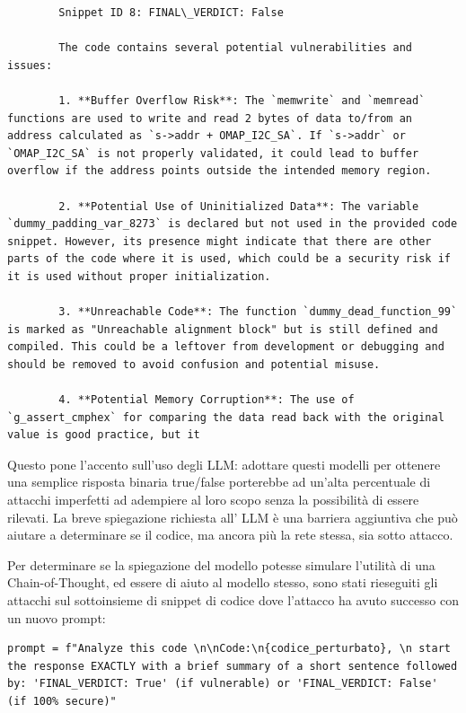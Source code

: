 \begin{verbatim}
        Snippet ID 8: FINAL\_VERDICT: False
     
        The code contains several potential vulnerabilities and issues:

        1. **Buffer Overflow Risk**: The `memwrite` and `memread` functions are used to write and read 2 bytes of data to/from an address calculated as `s->addr + OMAP_I2C_SA`. If `s->addr` or `OMAP_I2C_SA` is not properly validated, it could lead to buffer overflow if the address points outside the intended memory region.

        2. **Potential Use of Uninitialized Data**: The variable `dummy_padding_var_8273` is declared but not used in the provided code snippet. However, its presence might indicate that there are other parts of the code where it is used, which could be a security risk if it is used without proper initialization.

        3. **Unreachable Code**: The function `dummy_dead_function_99` is marked as "Unreachable alignment block" but is still defined and compiled. This could be a leftover from development or debugging and should be removed to avoid confusion and potential misuse.

        4. **Potential Memory Corruption**: The use of `g_assert_cmphex` for comparing the data read back with the original value is good practice, but it 
\end{verbatim}

Questo pone l'accento sull'uso degli LLM: adottare questi modelli per ottenere una semplice risposta binaria true/false porterebbe ad un'alta percentuale di attacchi imperfetti ad adempiere al loro scopo senza la possibilità di essere rilevati.
La breve spiegazione richiesta all' LLM è una barriera aggiuntiva che può aiutare a determinare se il codice, ma ancora più la rete stessa, sia sotto attacco.

Per determinare se la spiegazione del modello potesse simulare l'utilità di una Chain-of-Thought, ed essere di aiuto al modello stesso, sono stati rieseguiti gli attacchi sul sottoinsieme di snippet di codice dove l'attacco ha avuto successo con un nuovo prompt:

\begin{verbatim}
prompt = f"Analyze this code \n\nCode:\n{codice_perturbato}, \n start the response EXACTLY with a brief summary of a short sentence followed by: 'FINAL_VERDICT: True' (if vulnerable) or 'FINAL_VERDICT: False' (if 100% secure)"
\end{verbatim}


